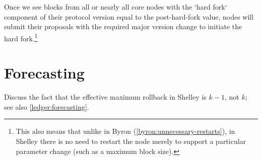 Once we see blocks from all or nearly all core nodes with the `hard fork`
component of their protocol version equal to the post-hard-fork value, nodes
will submit their proposals with the required major version change to initiate
the hard fork.\footnote{This also means that unlike in Byron
(\cref{byron:unnecessary-restarts}), in Shelley there is no need to restart the
node merely to support a particular parameter change (such as a maximum block
size).}

\section{Forecasting}
\label{shelley:forecasting}

Discuss the fact that the effective maximum rollback in Shelley is $k - 1$,
not $k$; see also \cref{ledger:forecasting}.
